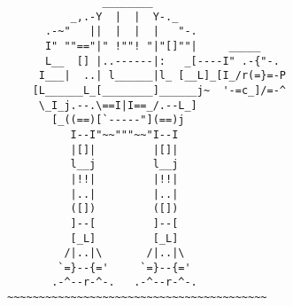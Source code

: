 \documentclass[12pt]{article}
\begin{document}
\vfill
\centering
\tiny %
\begin{BVerbatim}                             
               ________
          _,.-Y  |  |  Y-._
      .-~"   ||  |  |  |   "-.
      I" ""=="|" !""! "|"[]""|     _____
      L__  [] |..------|:   _[----I" .-{"-.
     I___|  ..| l______|l_ [__L]_[I_/r(=}=-P
    [L______L_[________]______j~  '-=c_]/=-^
     \_I_j.--.\==I|I==_/.--L_]
       [_((==)[`-----"](==)j
          I--I"~~"""~~"I--I
          |[]|         |[]|
          l__j         l__j
          |!!|         |!!|
          |..|         |..|
          ([])         ([])
          ]--[         ]--[
          [_L]         [_L]
         /|..|\       /|..|\
        `=}--{='     `=}--{='
       .-^--r-^-.   .-^--r-^-.
~~~~~~~~~~~~~~~~~~~~~~~~~~~~~~~~~~~~~~~~~
\end{BVerbatim}
\end{document}
